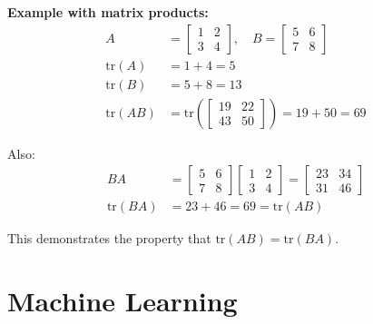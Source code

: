 \documentclass{article}
\begin{document}
\textbf{Example with matrix products:}
\begin{align}
A &= \begin{bmatrix} 1 & 2 \\ 3 & 4 \end{bmatrix}, \quad
B = \begin{bmatrix} 5 & 6 \\ 7 & 8 \end{bmatrix}\\
\text{tr}(A) &= 1 + 4 = 5\\
\text{tr}(B) &= 5 + 8 = 13\\
\text{tr}(AB) &= \text{tr}\left(\begin{bmatrix} 19 & 22 \\ 43 & 50 \end{bmatrix}\right) = 19 + 50 = 69
\end{align}

Also:
\begin{align}
BA &= \begin{bmatrix} 5 & 6 \\ 7 & 8 \end{bmatrix} \begin{bmatrix} 1 & 2 \\ 3 & 4 \end{bmatrix} = \begin{bmatrix} 23 & 34 \\ 31 & 46 \end{bmatrix}\\
\text{tr}(BA) &= 23 + 46 = 69 = \text{tr}(AB)
\end{align}

This demonstrates the property that $\text{tr}(AB) = \text{tr}(BA)$.

\section{Machine Learning}
\end{document}
